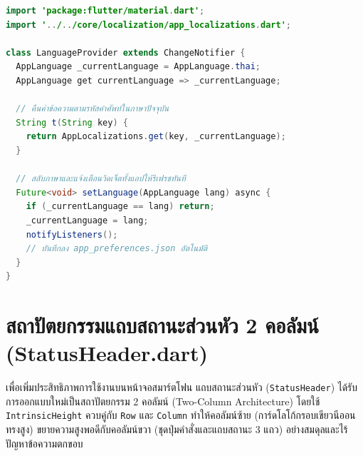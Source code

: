 \begin{codebox}[title={ซอร์สโค้ดคลาส LanguageProvider.dart}]
\begin{lstlisting}[language=Java]
import 'package:flutter/material.dart';
import '../../core/localization/app_localizations.dart';

class LanguageProvider extends ChangeNotifier {
  AppLanguage _currentLanguage = AppLanguage.thai;
  AppLanguage get currentLanguage => _currentLanguage;

  // คืนค่าข้อความตามรหัสคำศัพท์ในภาษาปัจจุบัน
  String t(String key) {
    return AppLocalizations.get(key, _currentLanguage);
  }

  // สลับภาษาและแจ้งเตือนวิดเจ็ตทั้งแอปให้รีเฟรชทันที
  Future<void> setLanguage(AppLanguage lang) async {
    if (_currentLanguage == lang) return;
    _currentLanguage = lang;
    notifyListeners();
    // บันทึกลง app_preferences.json อัตโนมัติ
  }
}
\end{lstlisting}
\end{codebox}

\section{สถาปัตยกรรมแถบสถานะส่วนหัว 2 คอลัมน์ (StatusHeader.dart)}

เพื่อเพิ่มประสิทธิภาพการใช้งานบนหน้าจอสมาร์ตโฟน แถบสถานะส่วนหัว (\texttt{StatusHeader}) ได้รับการออกแบบใหม่เป็นสถาปัตยกรรม 2 คอลัมน์ (Two-Column Architecture) โดยใช้ \texttt{IntrinsicHeight} ควบคู่กับ \texttt{Row} และ \texttt{Column} ทำให้คอลัมน์ซ้าย (การ์ดโลโก้กรอบเขียวนีออนทรงสูง) ขยายความสูงพอดีกับคอลัมน์ขวา (ชุดปุ่มคำสั่งและแถบสถานะ 3 แถว) อย่างสมดุลและไร้ปัญหาข้อความตกขอบ

